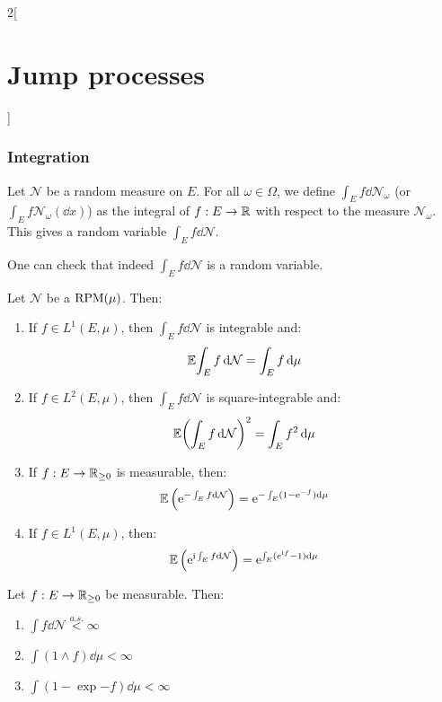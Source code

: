 \documentclass[../../../main_math.tex]{subfiles}
\begin{document}
\begin{multicols}{2}[\section{Jump processes}]
  \subsubsection{Integration}
  \begin{definition}
    Let $\mathcal{N}$ be a random measure on $E$. For all $\omega\in\Omega$, we define $\int_E f\dd{\mathcal{N}_\omega}$ (or $\int_E f\mathcal{N}_\omega(\dd{x})$) as the integral of $f:E\to\mathbb{R}$ with respect to the measure $\mathcal{N}_\omega$. This gives a random variable $\int_E f\dd{\mathcal{N}}$.
  \end{definition}
  \begin{remark}
    One can check that indeed $\int_E f\dd{\mathcal{N}}$ is a random variable.
  \end{remark}
  \begin{proposition}
    Let $\mathcal{N}$ be a $\mathrm{RPM}(\mu)$. Then:
    \begin{enumerate}
      \item If $f\in L^1(E,\mu)$, then $\int_E f\dd{\mathcal{N}}$ is integrable and: $$\mathbb{E}{\int_E f\dd{\mathcal{N}}}=\int_E f\dd{\mu}$$
      \item If $f\in L^2(E,\mu)$, then $\int_E f\dd{\mathcal{N}}$ is square-integrable and: $$\mathbb{E}{\left(\int_E f\dd{\mathcal{N}}\right)^2}=\int_E f^2\dd{\mu}$$
      \item If $f:E\to \mathbb{R}_{\geq 0}$ is measurable, then: $$
              \mathbb{E}\left(\mathrm{e}^{-\int_E f\dd{\mathcal{N}}}\right)=\mathrm{e}^{-\int_E (1-\mathrm{e}^{-f})\dd{\mu}}
            $$
      \item If $f\in L^1(E,\mu)$, then:
            $$
              \mathbb{E}\left(\mathrm{e}^{\mathrm{i} \int_E f\dd{\mathcal{N}}}\right)=\mathrm{e}^{\int_E (e^{\mathrm{i} f}-1)\dd{\mu}}
            $$
    \end{enumerate}
  \end{proposition}
  \begin{proposition}
    Let $f:E\to\mathbb{R}_{\geq 0}$ be measurable. Then:
    \begin{enumerate}
      \item $\displaystyle \int f\dd{\mathcal{N}}\overset{a.s.}{<}\infty$
      \item $\displaystyle \int (1\wedge f)\dd{\mu} <\infty$
      \item $\displaystyle \int (1-\exp{-f}) \dd{\mu}<\infty$
    \end{enumerate}
  \end{proposition}

\end{multicols}
\end{document}

